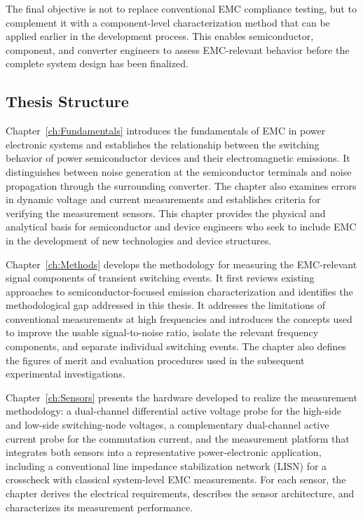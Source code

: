 The final objective is not to replace conventional EMC compliance testing, but to complement it with a component-level characterization method that can be applied earlier in the development process. 
This enables semiconductor, component, and converter engineers to assess EMC-relevant behavior before the complete system design has been finalized.


\subsection*{Thesis Structure}

Chapter~\ref{ch:Fundamentals} introduces the fundamentals of EMC in power electronic systems and establishes the relationship between the switching behavior of power semiconductor devices and their electromagnetic emissions. 
It distinguishes between noise generation at the semiconductor terminals and noise propagation through the surrounding converter. 
The chapter also examines errors in dynamic voltage and current measurements and establishes criteria for verifying the measurement sensors.
This chapter provides the physical and analytical basis for semiconductor and device engineers who seek to include EMC in the development of new technologies and device structures.

Chapter~\ref{ch:Methods} develops the methodology for measuring the EMC-relevant signal components of transient switching events. 
It first reviews existing approaches to semiconductor-focused emission characterization and identifies the methodological gap addressed in this thesis.
It addresses the limitations of conventional measurements at high frequencies and introduces the concepts used to improve the usable signal-to-noise ratio, isolate the relevant frequency components, and separate individual switching events. 
The chapter also defines the figures of merit and evaluation procedures used in the subsequent experimental investigations. 

Chapter~\ref{ch:Sensors} presents the hardware developed to realize the measurement methodology: a dual-channel differential active voltage probe for the high-side and low-side switching-node voltages, a complementary dual-channel active current probe for the commutation current, and the measurement platform that integrates both sensors into a representative power-electronic application, including a conventional line impedance stabilization network (LISN) for a crosscheck with classical system-level EMC measurements. 
For each sensor, the chapter derives the electrical requirements, describes the sensor architecture, and characterizes its measurement performance.


